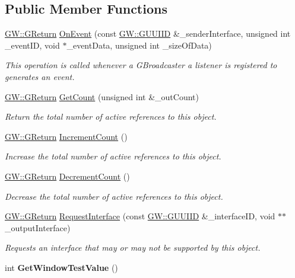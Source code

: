 \subsection*{Public Member Functions}
\begin{DoxyCompactItemize}
\item 
\hyperlink{namespaceGW_a67a839e3df7ea8a5c5686613a7a3de21}{G\+W\+::\+G\+Return} \hyperlink{classGWindowTestListener_a4033e5d1546bbf9fea0cc8062fb31423}{On\+Event} (const \hyperlink{structGW_1_1GUUIID}{G\+W\+::\+G\+U\+U\+I\+ID} \&\+\_\+sender\+Interface, unsigned int \+\_\+event\+ID, void $\ast$\+\_\+event\+Data, unsigned int \+\_\+size\+Of\+Data)
\begin{DoxyCompactList}\small\item\em This operation is called whenever a G\+Broadcaster a listener is registered to generates an event. \end{DoxyCompactList}\item 
\hyperlink{namespaceGW_a67a839e3df7ea8a5c5686613a7a3de21}{G\+W\+::\+G\+Return} \hyperlink{classGWindowTestListener_ab32d49a0521eae89c76337ff9796dc53}{Get\+Count} (unsigned int \&\+\_\+out\+Count)
\begin{DoxyCompactList}\small\item\em Return the total number of active references to this object. \end{DoxyCompactList}\item 
\hyperlink{namespaceGW_a67a839e3df7ea8a5c5686613a7a3de21}{G\+W\+::\+G\+Return} \hyperlink{classGWindowTestListener_a8a4d37e640f882b116bba8f76675c81a}{Increment\+Count} ()
\begin{DoxyCompactList}\small\item\em Increase the total number of active references to this object. \end{DoxyCompactList}\item 
\hyperlink{namespaceGW_a67a839e3df7ea8a5c5686613a7a3de21}{G\+W\+::\+G\+Return} \hyperlink{classGWindowTestListener_a4d5884434e75e2ff23edafe5e0608838}{Decrement\+Count} ()
\begin{DoxyCompactList}\small\item\em Decrease the total number of active references to this object. \end{DoxyCompactList}\item 
\hyperlink{namespaceGW_a67a839e3df7ea8a5c5686613a7a3de21}{G\+W\+::\+G\+Return} \hyperlink{classGWindowTestListener_ae73a5d2fb7659d1b7a98d35d068e6e75}{Request\+Interface} (const \hyperlink{structGW_1_1GUUIID}{G\+W\+::\+G\+U\+U\+I\+ID} \&\+\_\+interface\+ID, void $\ast$$\ast$\+\_\+output\+Interface)
\begin{DoxyCompactList}\small\item\em Requests an interface that may or may not be supported by this object. \end{DoxyCompactList}\item 
int {\bfseries Get\+Window\+Test\+Value} ()\hypertarget{classGWindowTestListener_a8c16dd8b8f68ce0311e946ce11669ace}{}\label{classGWindowTestListener_a8c16dd8b8f68ce0311e946ce11669ace}

\end{DoxyCompactItemize}


